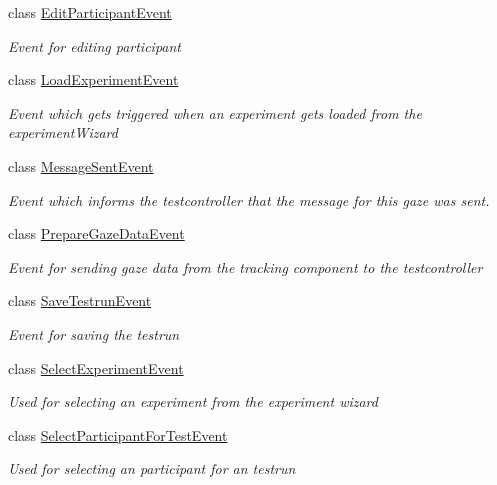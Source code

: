 \begin{DoxyCompactItemize}
class \hyperlink{class_web_analyzer_1_1_events_1_1_edit_participant_event}{Edit\+Participant\+Event}
\begin{DoxyCompactList}\small\item\em Event for editing participant \end{DoxyCompactList}\item 
class \hyperlink{class_web_analyzer_1_1_events_1_1_load_experiment_event}{Load\+Experiment\+Event}
\begin{DoxyCompactList}\small\item\em Event which gets triggered when an experiment gets loaded from the experiment\+Wizard \end{DoxyCompactList}\item 
class \hyperlink{class_web_analyzer_1_1_events_1_1_message_sent_event}{Message\+Sent\+Event}
\begin{DoxyCompactList}\small\item\em Event which informs the testcontroller that the message for this gaze was sent. \end{DoxyCompactList}\item 
class \hyperlink{class_web_analyzer_1_1_events_1_1_prepare_gaze_data_event}{Prepare\+Gaze\+Data\+Event}
\begin{DoxyCompactList}\small\item\em Event for sending gaze data from the tracking component to the testcontroller \end{DoxyCompactList}\item 
class \hyperlink{class_web_analyzer_1_1_events_1_1_save_testrun_event}{Save\+Testrun\+Event}
\begin{DoxyCompactList}\small\item\em Event for saving the testrun \end{DoxyCompactList}\item 
class \hyperlink{class_web_analyzer_1_1_events_1_1_select_experiment_event}{Select\+Experiment\+Event}
\begin{DoxyCompactList}\small\item\em Used for selecting an experiment from the experiment wizard \end{DoxyCompactList}\item 
class \hyperlink{class_web_analyzer_1_1_events_1_1_select_participant_for_test_event}{Select\+Participant\+For\+Test\+Event}
\begin{DoxyCompactList}\small\item\em Used for selecting an participant for an testrun \end{DoxyCompactList}\item 

\end{DoxyCompactItemize}
